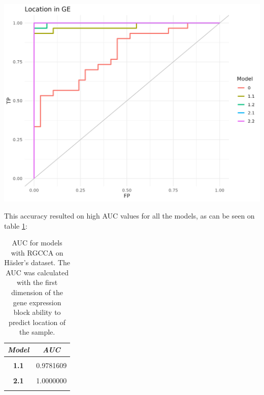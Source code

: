 \documentclass[
  12pt,
  a4paper,
  twoside,
  openright]{book}
\let\origfigure\figure
\let\endorigfigure\endfigure
\renewenvironment{figure}[1][2] {
    \expandafter\origfigure\expandafter[!ht]
} {
    \endorigfigure
}
\begin{document}
\begin{figure}
\includegraphics[width=1\linewidth]{images/hasler-auc} \caption[AUC for models with RGCCA on Häsler's dataset]{AUC for models with RGCCA on Häsler's dataset. The AUC was calculated with the first dimension of the gene expression block ability to predict location of the sample.}\label{fig:hasler-auc-plot}
\end{figure}

This accuracy resulted on high AUC values for all the models, as can be seen on table \ref{tab:hasler-auc}:

\begin{table}[H]

\caption[AUC for models with RGCCA on Häsler's dataset]{\label{tab:hasler-auc}AUC for models with RGCCA on Häsler's dataset. The AUC was calculated with the first dimension of the gene expression block ability to predict location of the sample.}
\centering
\begin{tabular}[t]{|>{}c|>{}c|}
\hline
\em{\textbf{Model}} & \em{\textbf{AUC}}\\
\hline
\textbf{\cellcolor{gray!6}{0}} & \cellcolor{gray!6}{0.8011494}\\
\hline
\textbf{1.1} & 0.9781609\\
\hline
\textbf{\cellcolor{gray!6}{1.2}} & \cellcolor{gray!6}{0.9977011}\\
\hline
\textbf{2.1} & 1.0000000\\
\hline
\textbf{\cellcolor{gray!6}{2.2}} & \cellcolor{gray!6}{1.0000000}\\
\hline
\end{tabular}
\end{table}
\end{document}
